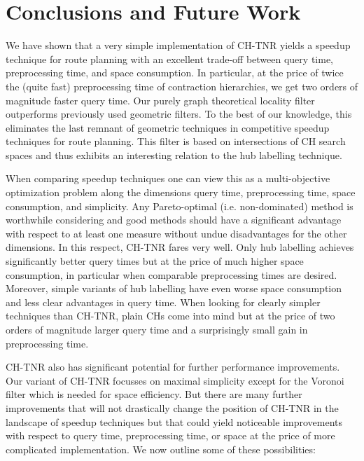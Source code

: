 \documentclass{llncs}
\begin{document}
\section{Conclusions and Future Work}\label{sec:tnr-conclusion}

We have shown that a very simple implementation of CH-TNR yields a speedup technique for route planning with an excellent trade-off between query time, preprocessing time, and space consumption.  In particular, at the price of twice the (quite fast) preprocessing time of contraction hierarchies, we get two orders of magnitude faster query time.  Our purely graph theoretical locality filter outperforms previously used geometric filters. To the best of our knowledge, this eliminates the last remnant of geometric techniques in competitive speedup techniques for route planning.  This filter is based on intersections of CH search spaces and thus exhibits an interesting relation to the hub labelling technique.

When comparing speedup techniques one can view this as a multi-objective optimization problem along the dimensions query time, preprocessing time, space consumption, and simplicity. Any Pareto-optimal (i.e. non-dominated) method is worthwhile considering and good methods should have a significant advantage with respect to at least one measure without undue disadvantages for the other dimensions. In this respect, CH-TNR fares very well. Only hub labelling achieves significantly better query times but at the price of much higher space consumption, in particular when comparable preprocessing times are desired. 
Moreover, simple variants of hub labelling have even worse space consumption and less clear advantages in query time. When looking for clearly simpler techniques than CH-TNR, plain CHs come into mind but at the price of two orders of magnitude larger query time and a surprisingly small gain in preprocessing time. 

CH-TNR also has significant potential for further performance improvements. Our variant of CH-TNR focusses on maximal simplicity except for the Voronoi filter which is needed for space efficiency. But there are many further improvements that will not drastically change the position of CH-TNR in the landscape of speedup techniques but that could yield noticeable improvements with respect to query time, preprocessing time, or space at the price of more complicated implementation. We now outline some of these possibilities:
\end{document}
